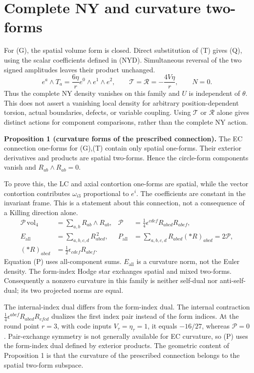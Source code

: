 \section{Complete NY and curvature two-forms}
\label{sec:revised3}

For (G), the spatial volume form is closed. Direct substitution of (T) gives (Q), using the scalar coefficients defined in (NYD). Simultaneous reversal of the two signed amplitudes leaves their product unchanged.
\begin{equation}
e^a\wedge T_a=\frac{6\eta}{r}e^0\wedge e^1\wedge e^2,
\qquad \mathcal T=\mathcal R=-\frac{4V\eta}{r},\qquad N=0.
\tag{Q}\label{eq:Q}
\end{equation}
Thus the complete NY density vanishes on this family and $U$ is independent of $\theta$. This does not assert a vanishing local density for arbitrary position-dependent torsion, actual boundaries, defects, or variable coupling. Using $\mathcal T$ or $\mathcal R$ alone gives distinct actions for component comparisons, rather than the complete NY action.

\textbf{Proposition 1 (curvature forms of the prescribed connection).} The EC connection one-forms for (G),(T) contain only spatial one-forms. Their exterior derivatives and products are spatial two-forms. Hence the circle-form components vanish and $R_{ab}\wedge R_{ab}=0$.

To prove this, the LC and axial contortion one-forms are spatial, while the vector contortion contributes $\omega_{i3}$ proportional to $e^i$. The coefficients are constant in the invariant frame. This is a statement about this connection, not a consequence of a Killing direction alone.
\begin{equation}
\begin{aligned}
\mathcal P\,\mathrm{vol}_4&=\sum_{a,b}R_{ab}\wedge R_{ab},
&\mathcal P&=\frac14\epsilon^{cdef}R_{abcd}R_{abef},\\
E_{\mathrm{all}}&=\sum_{a,b,c,d}R_{abcd}^{\,2},
&P_{\mathrm{all}}&=\sum_{a,b,c,d}R_{abcd}(*R)_{abcd}=2\mathcal P,\\
(*R)_{abcd}&=\frac12\epsilon_{cdef}R_{abef}.
\end{aligned}
\tag{P}\label{eq:P}
\end{equation}
Equation (P) uses all-component sums. $E_{\mathrm{all}}$ is a curvature norm, not the Euler density. The form-index Hodge star exchanges spatial and mixed two-forms. Consequently a nonzero curvature in this family is neither self-dual nor anti-self-dual; its two projected norms are equal.

The internal-index dual differs from the form-index dual. The internal contraction $\frac14\epsilon^{abef}R_{abcd}R_{efcd}$ dualizes the first index pair instead of the form indices. At the round point $r=3$, with code inputs $V_\tau=\eta_\tau=1$, it equals $-16/27$, whereas $\mathcal P=0$. Pair-exchange symmetry is not generally available for EC curvature, so (P) uses the form-index dual defined by exterior products. The geometric content of Proposition 1 is that the curvature of the prescribed connection belongs to the spatial two-form subspace.
